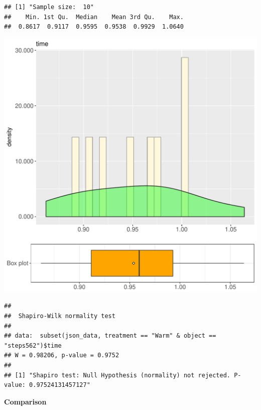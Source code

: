 \documentclass{article}\usepackage[]{graphicx}\usepackage[]{color}
\makeatletter
\def\maxwidth{ %
  \ifdim\Gin@nat@width>\linewidth
    \linewidth
  \else
    \Gin@nat@width
  \fi
}
\newenvironment{kframe}{%
 \def\at@end@of@kframe{}%
 \ifinner\ifhmode%
  \def\at@end@of@kframe{\end{minipage}}%
  \begin{minipage}{\columnwidth}%
 \fi\fi%
 \def\FrameCommand##1{\hskip\@totalleftmargin \hskip-\fboxsep
 \colorbox{shadecolor}{##1}\hskip-\fboxsep
     \hskip-\linewidth \hskip-\@totalleftmargin \hskip\columnwidth}%
 \MakeFramed {\advance\hsize-\width
   \@totalleftmargin\z@ \linewidth\hsize
   \@setminipage}}%
 {\par\unskip\endMakeFramed%
 \at@end@of@kframe}
\newenvironment{knitrout}{}{} %
\makeatother
\begin{document}
\begin{knitrout}
\color{fgcolor}\begin{kframe}
\begin{verbatim}
## [1] "Sample size:  10"
##    Min. 1st Qu.  Median    Mean 3rd Qu.    Max. 
##  0.8617  0.9117  0.9595  0.9538  0.9929  1.0640
\end{verbatim}
\end{kframe}
\includegraphics[width=\maxwidth]{figure/RH1_Warm_steps562-1} 
\begin{kframe}\begin{verbatim}
## 
## 	Shapiro-Wilk normality test
## 
## data:  subset(json_data, treatment == "Warm" & object == "steps562")$time
## W = 0.98206, p-value = 0.9752
## 
## [1] "Shapiro test: Null Hypothesis (normality) not rejected. P-value: 0.97524131457127"
\end{verbatim}
\end{kframe}
\end{knitrout}
  
 \textbf{Comparison}
  
\end{document}

